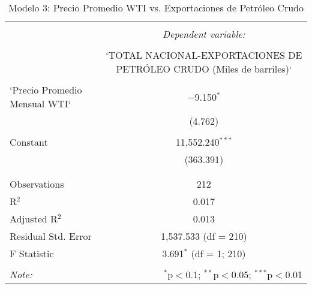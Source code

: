 
\begin{table}[!htbp] \centering 
  \caption{Modelo 3: Precio Promedio WTI vs. Exportaciones de Petróleo Crudo} 
  \label{} 
\begin{tabular}{@{\extracolsep{5pt}}lc} 
\\[-1.8ex]\hline 
\hline \\[-1.8ex] 
 & \multicolumn{1}{c}{\textit{Dependent variable:}} \\ 
\cline{2-2} 
\\[-1.8ex] & `TOTAL NACIONAL-EXPORTACIONES DE PETRÓLEO CRUDO (Miles de barriles)` \\ 
\hline \\[-1.8ex] 
 `Precio Promedio Mensual WTI` & $-$9.150$^{*}$ \\ 
  & (4.762) \\ 
  & \\ 
 Constant & 11,552.240$^{***}$ \\ 
  & (363.391) \\ 
  & \\ 
\hline \\[-1.8ex] 
Observations & 212 \\ 
R$^{2}$ & 0.017 \\ 
Adjusted R$^{2}$ & 0.013 \\ 
Residual Std. Error & 1,537.533 (df = 210) \\ 
F Statistic & 3.691$^{*}$ (df = 1; 210) \\ 
\hline 
\hline \\[-1.8ex] 
\textit{Note:}  & \multicolumn{1}{r}{$^{*}$p$<$0.1; $^{**}$p$<$0.05; $^{***}$p$<$0.01} \\ 
\end{tabular} 
\end{table} 

